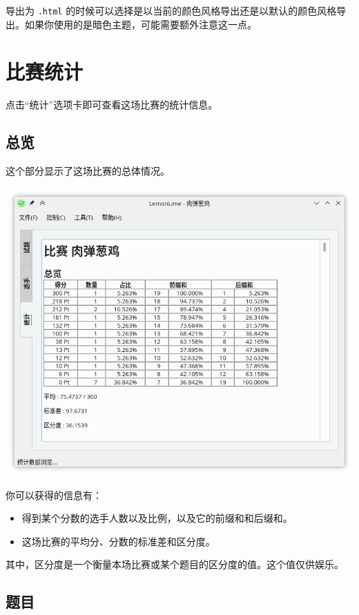 \documentclass[UTF-8]{ctexart}
\begin{document}
		导出为 \texttt{.html} 的时候可以选择是以当前的颜色风格导出还是以默认的颜色风格导出。如果你使用的是暗色主题，可能需要额外注意这一点。

	\newpage

	\section{比赛统计}

		点击“统计”选项卡即可查看这场比赛的统计信息。

		\subsection{总览}

			这个部分显示了这场比赛的总体情况。

			\begin{center}
			\includegraphics[scale=0.5]{pics/statistics.png}
			\end{center}

			你可以获得的信息有：

			\begin{itemize}
				\item 得到某个分数的选手人数以及比例，以及它的前缀和和后缀和。
				\item 这场比赛的平均分、分数的标准差和区分度。
			\end{itemize}

			其中，区分度是一个衡量本场比赛或某个题目的区分度的值。这个值仅供娱乐。


		\subsection{题目}
\end{document}
